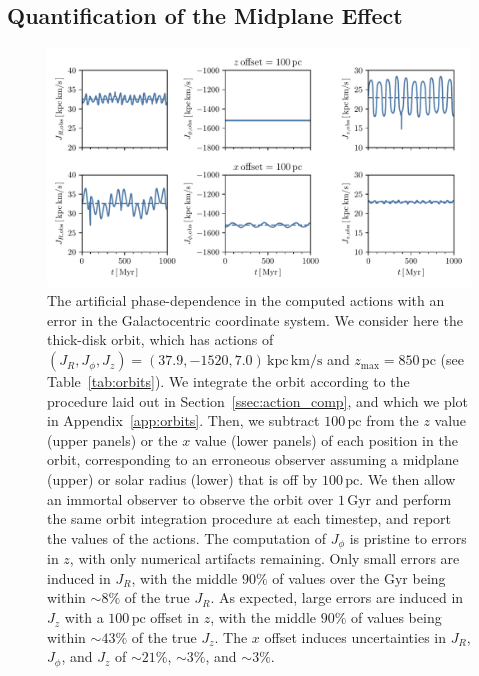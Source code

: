 \documentclass[twocolumn]{aastex62}
\newcommand{\pc}{\text{pc}}
\newcommand{\Gyr}{\text{Gyr}}
\newcommand{\kms}{\text{km}/\text{s}}
\newcommand{\actunit}{\text{kpc}\,\kms}
\begin{document}
\subsection{Quantification of the Midplane Effect} \label{ssec:quant}

\begin{figure}[ht!]
\begin{center}
\includegraphics[width=\textwidth]{fig/schmactions_one_orbit.pdf}
\end{center}
\caption{The artificial phase-dependence in the computed actions with an
error in the Galactocentric coordinate system. We consider here the thick-disk
orbit, which has actions of $(J_R, J_{\phi}, J_z) = (37.9, -1520,
7.0)\,\actunit$ and $z_{\text{max}}=850\,\pc$ (see Table~\ref{tab:orbits}). We
integrate the orbit according to the procedure laid out in
Section~\ref{ssec:action_comp}, and which we plot in
Appendix~\ref{app:orbits}. Then, we subtract $100\,\pc$ from the $z$ value
(upper panels) or the $x$ value (lower panels) of each position in the orbit,
corresponding to an erroneous observer assuming a midplane (upper) or solar
radius (lower) that is off by $100\,\pc$. We then allow an immortal observer
to observe the orbit over $1\,\Gyr$ and perform the same orbit integration
procedure at each timestep, and report the values of the actions. The
computation of $J_{\phi}$ is pristine to errors in $z$, with only numerical
artifacts remaining. Only small errors are induced in $J_R$, with the middle
$90\%$ of values over the $\Gyr$ being within $\sim8\%$ of the true $J_R$. As
expected, large errors are induced in $J_z$ with a $100\,\pc$ offset in $z$,
with the middle $90\%$ of values being within $\sim43\%$ of the true $J_z$.
The $x$ offset induces uncertainties in $J_R$, $J_{\phi}$, and $J_z$ of
$\sim21\%$, $\sim3\%$, and $\sim3\%$.}
\label{fig:one_orbit_wrong_ref}
\end{figure}
\end{document}
